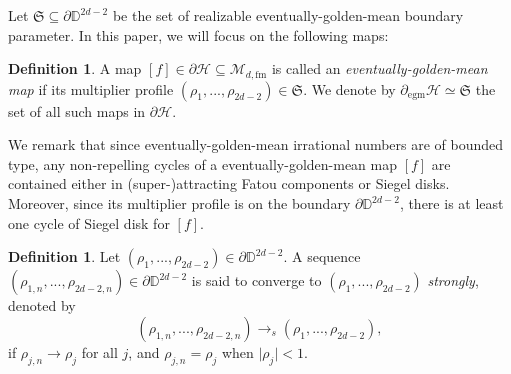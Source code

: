 \documentclass[11pt, reqno]{amsart}
\numberwithin{equation}{section}
\theoremstyle{plain}
\theoremstyle{theorem}
\theoremstyle{plain}
\theoremstyle{definition}
\newtheorem{defn}[theorem]{Definition}
\newcommand{\D}{\mathbb{D}}
\newcommand{\fm}{\text{fm}}
\numberwithin{figure}{section}
\newcommand{\egm}{{\operatorname{egm}}}
\begin{document}
Let $\mathfrak{S} \subseteq \partial \D^{2d-2}$ be the set of realizable eventually-golden-mean boundary parameter.
In this paper, we will focus on the following maps:
\begin{defn}
\label{defn:EGM maps}
A map $[f] \in \partial \mathcal{H} \subseteq \mathcal{M}_{d,\fm}$ is called an {\em eventually-golden-mean map} if its multiplier profile $(\rho_1,..., \rho_{2d-2}) \in \mathfrak{S}$. We denote by $\partial_\egm \mathcal H\simeq \mathfrak{S}$ the set of all such maps in $\partial \mathcal H$.
\end{defn}

We remark that since eventually-golden-mean irrational numbers are of bounded type, any non-repelling cycles of a eventually-golden-mean map $[f]$ are contained either in (super-)attracting Fatou components or Siegel disks.
Moreover, since its multiplier profile is on the boundary $\partial \D^{2d-2}$, there is at least one cycle of Siegel disk for $[f]$.

\begin{defn}\label{defn:strong}
Let $(\rho_1,..., \rho_{2d-2}) \in  \partial \D^{2d-2}$.
A sequence $(\rho_{1,n},..., \rho_{2d-2,n})\in  \partial \D^{2d-2}$ is said to converge to $(\rho_1,..., \rho_{2d-2})$ {\em strongly}, denoted by 
$$
(\rho_{1,n},..., \rho_{2d-2,n}) \to_s (\rho_1,..., \rho_{2d-2}),
$$
if $\rho_{j,n} \to \rho_j$ for all $j$, and $\rho_{j,n} = \rho_j$ when $\vert \rho_{j} \vert < 1$.
\end{defn}
\end{document}
